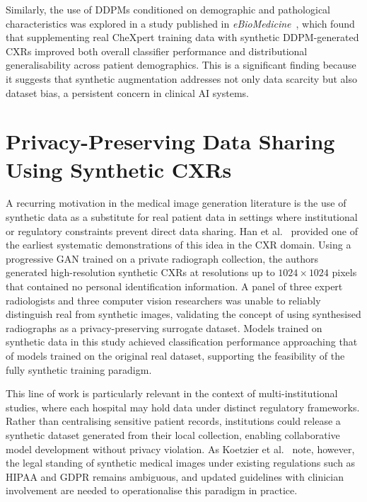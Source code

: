 Similarly, the use of DDPMs conditioned on demographic and pathological characteristics was
explored in a study published in \emph{eBioMedicine}~\cite{Ktena2024}, which found that
supplementing real CheXpert training data with synthetic DDPM-generated CXRs improved both
overall classifier performance and distributional generalisability across patient demographics.
This is a significant finding because it suggests that synthetic augmentation addresses not
only data scarcity but also dataset bias, a persistent concern in clinical AI systems. 


\section{Privacy-Preserving Data Sharing Using Synthetic CXRs}
\label{sec:rw_privacy}

A recurring motivation in the medical image generation literature is the use of synthetic data
as a substitute for real patient data in settings where institutional or regulatory constraints
prevent direct data sharing. Han et al.~\cite{Han2020} provided one of the earliest systematic
demonstrations of this idea in the CXR domain. Using a progressive GAN trained on a private
radiograph collection, the authors generated high-resolution synthetic CXRs at resolutions up
to $1024 \times 1024$ pixels that contained no personal identification information. A panel of
three expert radiologists and three computer vision researchers was unable to reliably
distinguish real from synthetic images, validating the concept of using synthesised radiographs
as a privacy-preserving surrogate dataset. Models trained on synthetic data in this study
achieved classification performance approaching that of models trained on the original real
dataset, supporting the feasibility of the fully synthetic training paradigm.

This line of work is particularly relevant in the context of multi-institutional studies,
where each hospital may hold data under distinct regulatory frameworks. Rather than
centralising sensitive patient records, institutions could release a synthetic dataset
generated from their local collection, enabling collaborative model development without
privacy violation. As Koetzier et al.~\cite{Koetzier2024} note, however, the legal standing
of synthetic medical images under existing regulations such as HIPAA and GDPR remains
ambiguous, and updated guidelines with clinician involvement are needed to operationalise
this paradigm in practice.

